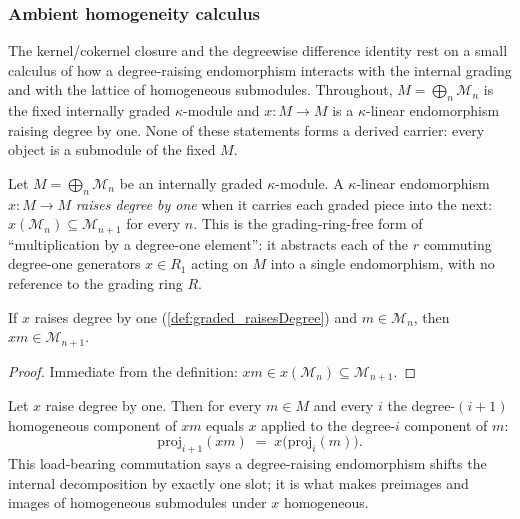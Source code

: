 \subsubsection*{Ambient homogeneity calculus}

The kernel/cokernel closure and the degreewise difference identity rest on a small
calculus of how a degree-raising endomorphism interacts with the internal grading and
with the lattice of homogeneous submodules. Throughout, \(M = \bigoplus_n \mathcal{M}_n\)
is the fixed internally graded \(\kappa\)-module and \(x : M \to M\) is a
\(\kappa\)-linear endomorphism raising degree by one. None of these statements forms a
derived carrier: every object is a submodule of the fixed \(M\).

\begin{definition}
  \label{def:graded_raisesDegree}
  Let \(M = \bigoplus_n \mathcal{M}_n\) be an internally graded \(\kappa\)-module. A
  \(\kappa\)-linear endomorphism \(x : M \to M\) \emph{raises degree by one} when it
  carries each graded piece into the next: \(x(\mathcal{M}_n) \subseteq
  \mathcal{M}_{n+1}\) for every \(n\). This is the grading-ring-free form of
  ``multiplication by a degree-one element'': it abstracts each of the \(r\)
  commuting degree-one generators \(x \in R_1\) acting on \(M\) into a single
  endomorphism, with no reference to the grading ring \(R\).
\end{definition}

\begin{lemma}
  \label{lem:graded_raisesDegree_mem}
  If \(x\) raises degree by one (\cref{def:graded_raisesDegree}) and \(m \in
  \mathcal{M}_n\), then \(x m \in \mathcal{M}_{n+1}\).
\end{lemma}

\begin{proof}
  \leanok
  Immediate from the definition: \(x m \in x(\mathcal{M}_n) \subseteq
  \mathcal{M}_{n+1}\).
\end{proof}

\begin{lemma}
  \label{lem:graded_decompose_raisesDegree}
  Let \(x\) raise degree by one. Then for every \(m \in M\) and every \(i\) the
  degree-\((i+1)\) homogeneous component of \(x m\) equals \(x\) applied to the
  degree-\(i\) component of \(m\):
  \[
    \mathrm{proj}_{i+1}(x m) \;=\; x\bigl(\mathrm{proj}_i(m)\bigr) .
  \]
  This load-bearing commutation says a degree-raising endomorphism shifts the
  internal decomposition by exactly one slot; it is what makes preimages and images
  of homogeneous submodules under \(x\) homogeneous.
\end{lemma}

